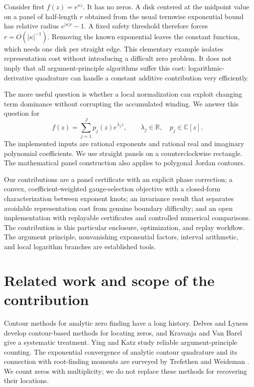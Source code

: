 \documentclass[11pt,a4paper]{article}
\newcommand{\CC}{\mathbb C}
\newcommand{\RR}{\mathbb R}
\begin{document}
Consider first $f(z)=e^{\kappa z}$. It has no zeros. A disk centered at the midpoint value on a panel of half-length $r$ obtained from the usual termwise exponential bound has relative radius $e^{|\kappa|r}-1$. A fixed safety threshold therefore forces $r=O(|\kappa|^{-1})$. Removing the known exponential leaves the constant function, which needs one disk per straight edge. This elementary example isolates representation cost without introducing a difficult zero problem. It does not imply that all argument-principle algorithms suffer this cost: logarithmic-derivative quadrature can handle a constant additive contribution very efficiently.

The more useful question is whether a local normalization can exploit changing term dominance without corrupting the accumulated winding. We answer this question for
\begin{equation}\label{eq:model}
 f(z)=\sum_{j=1}^J p_j(z)e^{\lambda_j z},\qquad \lambda_j\in\RR,
 \quad p_j\in\CC[z].
\end{equation}
The implemented inputs are rational exponents and rational real and imaginary polynomial coefficients. We use straight panels on a counterclockwise rectangle. The mathematical panel construction also applies to polygonal Jordan contours.

Our contributions are a panel certificate with an explicit phase correction; a convex, coefficient-weighted gauge-selection objective with a closed-form characterization between exponent knots; an invariance result that separates avoidable representation cost from genuine boundary difficulty; and an open implementation with replayable certificates and controlled numerical comparisons. The contribution is this particular enclosure, optimization, and replay workflow. The argument principle, nonvanishing exponential factors, interval arithmetic, and local logarithm branches are established tools.

\section{Related work and scope of the contribution}
Contour methods for analytic zero finding have a long history. Delves and Lyness \cite{delves1967} develop contour-based methods for locating zeros, and Kravanja and Van Barel \cite{kravanja2000} give a systematic treatment. Ying and Katz \cite{ying1988} study reliable argument-principle counting. The exponential convergence of analytic contour quadrature and its connection with root-finding moments are surveyed by Trefethen and Weideman \cite{trefethen2014}. We count zeros with multiplicity; we do not replace these methods for recovering their locations.
\end{document}
